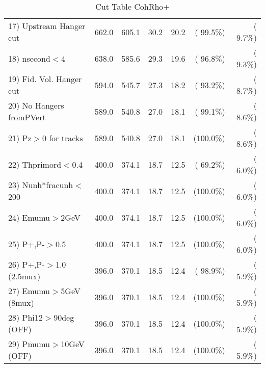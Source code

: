 \begin{table}[h!]
\begin{tabular}{||l||r|r|r|r|r|r||}
 17) Upstream Hanger cut  &        662.0 &        605.1 &         30.2 &         20.2 & ( 99.5\%) & (  9.7\%) \\
 18) nsecond$<$4          &        638.0 &        585.6 &         29.3 &         19.6 & ( 96.8\%) & (  9.3\%) \\
 19) Fid. Vol. Hanger cut &        594.0 &        545.7 &         27.3 &         18.2 & ( 93.2\%) & (  8.7\%) \\
 20) No Hangers fromPVert &        589.0 &        540.8 &         27.0 &         18.1 & ( 99.1\%) & (  8.6\%) \\
 21) Pz$>$0 for tracks    &        589.0 &        540.8 &         27.0 &         18.1 & (100.0\%) & (  8.6\%) \\
 22) Thprimord$<$0.4      &        400.0 &        374.1 &         18.7 &         12.5 & ( 69.2\%) & (  6.0\%) \\
 23) Nunh*fracunh$<$200   &        400.0 &        374.1 &         18.7 &         12.5 & (100.0\%) & (  6.0\%) \\
 24) Emumu$>$2GeV         &        400.0 &        374.1 &         18.7 &         12.5 & (100.0\%) & (  6.0\%) \\
 25) P+,P-$>$0.5          &        400.0 &        374.1 &         18.7 &         12.5 & (100.0\%) & (  6.0\%) \\
 26) P+,P-$>$1.0 (2.5mux) &        396.0 &        370.1 &         18.5 &         12.4 & ( 98.9\%) & (  5.9\%) \\
 27) Emumu$>$5GeV  (8mux) &        396.0 &        370.1 &         18.5 &         12.4 & (100.0\%) & (  5.9\%) \\
 28) Phi12$>$90deg  (OFF) &        396.0 &        370.1 &         18.5 &         12.4 & (100.0\%) & (  5.9\%) \\
 29) Pmumu$>$10GeV  (OFF) &        396.0 &        370.1 &         18.5 &         12.4 & (100.0\%) & (  5.9\%) \\
 \hline
 \hline
 \end{tabular}
 \caption{Cut Table  CohRho+  }
 \label{tab-cutcohjpsi-mumu_cohrhop}
 \end{table}
